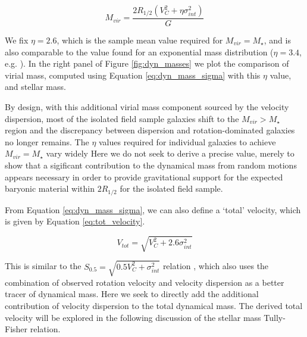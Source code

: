 \documentclass[fleqn,usenatbib]{mnras}
\begin{document}
\begin{equation}\label{eq:dyn_mass_sigma}
   M_{vir} = \frac{2R_{1/2}\left(V_{C}^{2} + \eta\sigma_{int}^{2}\right)}{G}
\end{equation}

\noindent
We fix $\eta=2.6$, which is the sample mean value required for $M_{vir}=M_{\star}$, and is also comparable to the value found for an exponential mass distribution ($\eta=3.4$, e.g. \citealt{Burkert2010,Newman2013}).
In the right panel of Figure \ref{fig:dyn_masses} we plot the comparison of virial mass, computed using Equation \ref{eq:dyn_mass_sigma} with this $\eta$ value, and stellar mass.

By design, with this additional virial mass component sourced by the velocity dispersion, most of the isolated field sample galaxies shift to the $M_{vir} > M_{\star}$ region and the discrepancy between dispersion and rotation-dominated galaxies no longer remains.
The $\eta$ values required for individual galaxies to achieve $M_{vir}=M_{\star}$ vary widely
Here we do not seek to derive a precise value, merely to show that a sigificant contribution to the dynamical mass from random motions appears necessary in order to provide gravitational support for the expected baryonic material within $2R_{1/2}$ for the isolated field sample.

From Equation \ref{eq:dyn_mass_sigma}, we can also define a `total' velocity, which is given by Equation \ref{eq:tot_velocity}.

\begin{equation}\label{eq:tot_velocity}
   V_{tot} = \sqrt{V_{C}^{2} + 2.6\sigma_{int}^{2}}
\end{equation}

\noindent
This is similar to the $S_{0.5} = \sqrt{0.5V_{C}^{2} + \sigma_{int}^{2}}$ relation \citep{Kassin2007}, which also uses the combination of observed rotation velocity and velocity dispersion as a better tracer of dynamical mass.
Here we seek to directly add the additional contribution of velocity dispersion to the total dynamical mass.
The derived total velocity will be explored in the following discussion of the stellar mass Tully-Fisher relation. 
\end{document}
